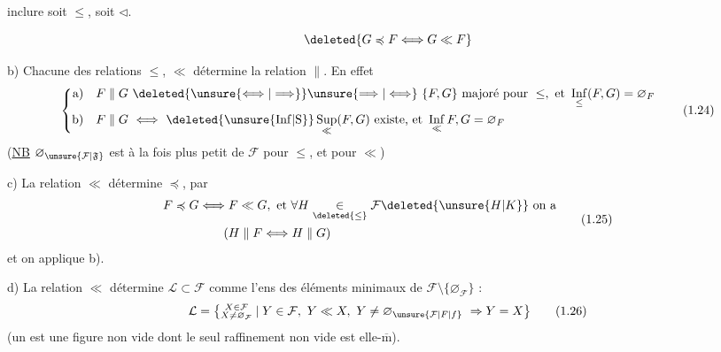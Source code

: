 inclure soit $\leq$, soit $\triangleleft$.

\[
\deleted{G\preccurlyeq F\Longleftrightarrow G\ll F}
\]

b) Chacune des relations $\leq$, $\ll$ détermine la relation $\parallel$. En effet
\[
\left\{\begin{aligned}
\text{a)}\quad F\parallel G &\ \deleted{\unsure{\Longleftrightarrow|\Longrightarrow}}\unsure{\Longrightarrow|\Longleftrightarrow}\
 \{F,G\}\ \text{majoré pour }\leq,\ \text{et }\mathop{\mathrm{Inf}}\limits_{\leq}(F,G)=\varnothing_F\\
\text{b)}\quad F\parallel G &\ \Longleftrightarrow\
 \deleted{\unsure{\mathrm{Inf}|\mathrm{S}}}\mathop{\mathrm{Sup}}\limits_{\ll}(F,G)\ \text{existe, et }\mathop{\mathrm{Inf}}\limits_{\ll} F,G=\varnothing_F
\end{aligned}\right.
\tag*{(1.24)}
\]
(\uline{NB} $\varnothing_{\unsure{\mathcal{F}|\mathfrak{F}}}$ est à la fois plus petit  de $\mathcal{F}$ pour $\leq$, et pour $\ll$)

c) La relation $\ll$ détermine $\preccurlyeq$, par
\margin{$\times$}
\[
\begin{aligned}
F\preccurlyeq G &\Longleftrightarrow F\ll G,\ \text{et }\forall H\underset{\deleted{\leq}}{\in}\mathcal{F}\deleted{\unsure{H|K}}\ \text{on a}\\
&\hspace{2em}(H\parallel F\Longleftrightarrow H\parallel G)
\end{aligned}
\tag*{(1.25)}
\]
et on applique b).

d) La relation $\ll$ détermine $\mathcal{L}\subset\mathcal{F}$ comme l'ens des éléments minimaux de $\mathcal{F}\setminus\{\varnothing_{\mathcal{F}}\}$ :
\[
\mathcal{L}=\bigl\{\substack{X\in\mathcal{F}\\ X\neq\varnothing_{\mathcal{F}}}\mid
 Y\in\mathcal{F},\ Y\ll X,\ Y\neq\varnothing_{\unsure{\mathcal{F}|F|f}}\ \Rightarrow Y=X\bigr\} \tag*{(1.26)}
\]
(un \unsure{lieu|lien} est une figure non vide dont le seul raffinement non vide est elle-$\overline{\mathrm m}$).

